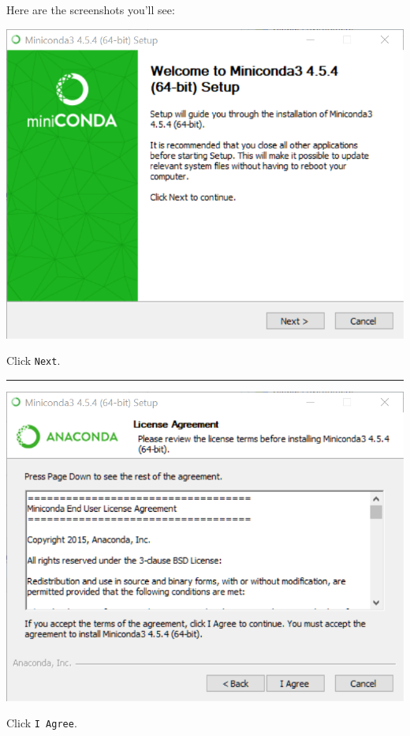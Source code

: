 \documentclass[]{book}
\theoremstyle{definition}
\theoremstyle{definition}
\theoremstyle{definition}
\theoremstyle{remark}
\begin{document}
Here are the screenshots you'll see:

\begin{center}\includegraphics[width=0.9\linewidth]{screenshots/2018-08-31_16_12_57-Miniconda3_4.5.4_(64-bit)_Setup} \end{center}

Click \texttt{Next}.

\begin{center}\rule{0.5\linewidth}{\linethickness}\end{center}

\begin{center}\includegraphics[width=0.9\linewidth]{screenshots/2018-08-31_16_13_57-Miniconda3_4.5.4_(64-bit)_Setup} \end{center}

Click \texttt{I\ Agree}.
\end{document}
